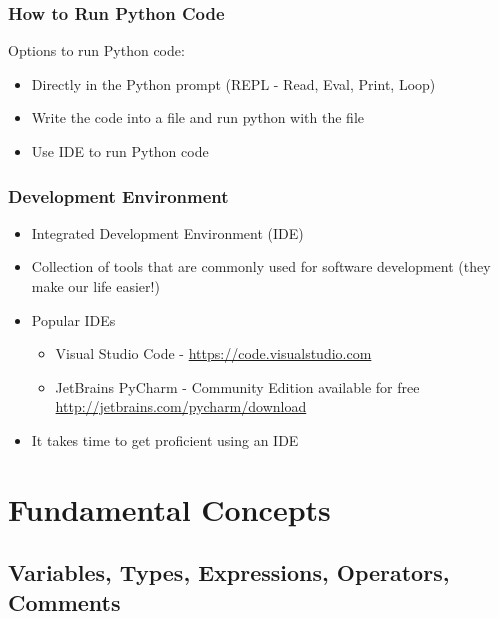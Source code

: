 \documentclass[10pt, a4paper]{beamer} %
\begin{document}
\begin{frame}[fragile,c]\frametitle{How to Run Python Code}

	\begin{block}{Options to run Python code:}
		\begin{itemize}
			\item Directly in the Python prompt (REPL - Read, Eval, Print, Loop)
			\item Write the code into a file and run python with the file
			\item Use IDE to run Python code
		\end{itemize}
	\end{block}

\end{frame}

\begin{frame}[c]\frametitle{Development Environment}

	\begin{itemize}
		\item Integrated Development Environment (IDE)
		\item Collection of tools that are commonly used for software development (they make our life easier!)
		\item Popular IDEs
		      \begin{itemize}
			      \item Visual Studio Code - \url{https://code.visualstudio.com}
			      \item JetBrains PyCharm - Community Edition available for free \url{http://jetbrains.com/pycharm/download}
		      \end{itemize}
		\item It takes time to get proficient using an IDE
	\end{itemize}
\end{frame}


\section{Fundamental Concepts} %
\label{sec:fundamental_concepts}

\subsection{Variables, Types, Expressions, Operators, Comments} %
\label{sub:Types_variables_expressions_operators_comments}
\end{document}
